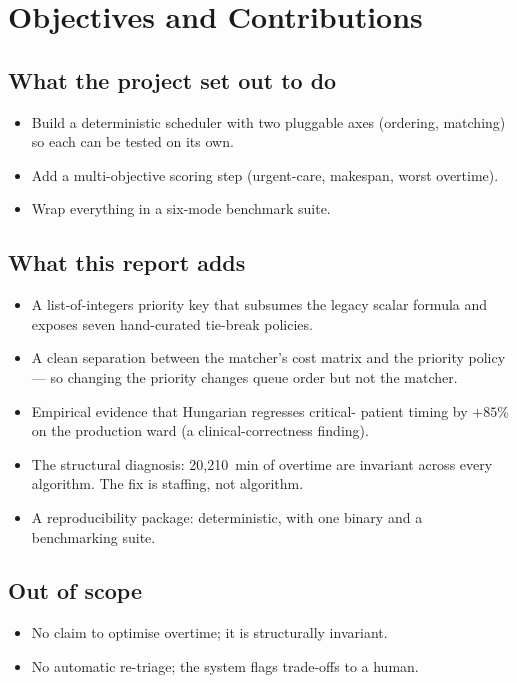 \section{Objectives and Contributions}
\label{sec:objectives}

\subsection{What the project set out to do}

\begin{itemize}
  \item Build a deterministic scheduler with two pluggable axes
        (ordering, matching) so each can be tested on its own.
  \item Add a multi-objective scoring step (urgent-care, makespan,
        worst overtime).
  \item Wrap everything in a six-mode benchmark suite.
\end{itemize}

\subsection{What this report adds}

\begin{itemize}
  \item A list-of-integers priority key that subsumes the legacy
        scalar formula and exposes seven hand-curated tie-break
        policies.
  \item A clean separation between the matcher's cost matrix and
        the priority policy --- so changing the priority changes
        queue order but not the matcher.
  \item Empirical evidence that Hungarian regresses critical-
        patient timing by $+85\%$ on the production ward (a
        clinical-correctness finding).
  \item The structural diagnosis: 20{,}210~min of overtime are
        invariant across every algorithm. The fix is staffing,
        not algorithm.
  \item A reproducibility package: deterministic, with one binary and a benchmarking suite.
\end{itemize}

\subsection{Out of scope}

\begin{itemize}
  \item No claim to optimise overtime; it is structurally invariant.
  \item No automatic re-triage; the system flags trade-offs to a human.
\end{itemize}
